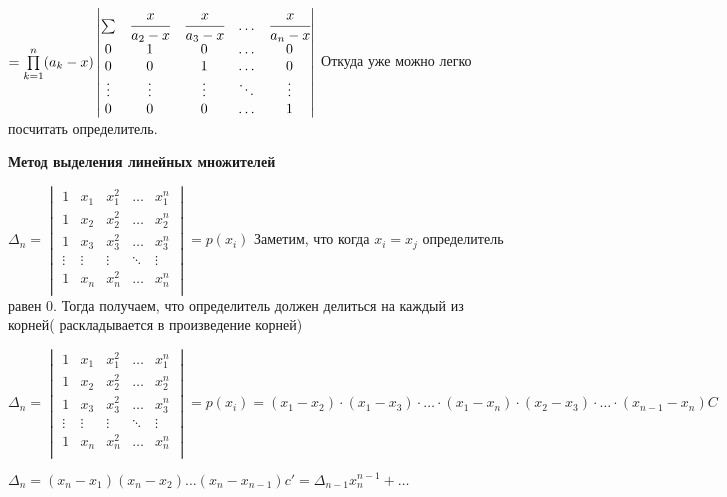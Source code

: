 \(=
\prod\limits_{k=1}^n (a_k-x)
\begin{vmatrix}
    \sum   & \cfrac{x}{a_2-x} & \cfrac{x}{a_3-x} & \ldots & \cfrac{x}{a_n-x} \\
    0      & 1                & 0                & \ldots & 0                \\
    0      & 0                & 1                & \ldots & 0                \\
    \vdots & \vdots           & \vdots           & \ddots & \vdots           \\
    0      & 0                & 0                & \ldots & 1                \\
\end{vmatrix}
\)
Откуда уже можно легко посчитать определитель.

\textbf{Метод выделения линейных множителей}


\(
\Delta_n = \begin{vmatrix}
    1      & x_1    & x_1^2  & \ldots & x_1^n  \\
    1      & x_2    & x_2^2  & \ldots & x_2^n  \\
    1      & x_3    & x_3^2  & \ldots & x_3^n  \\
    \vdots & \vdots & \vdots & \ddots & \vdots \\
    1      & x_n    & x_n^2  & \ldots & x_n^n  \\
\end{vmatrix} = p(x_i)
\)
Заметим, что когда \(x_i  = x_j \) определитель равен 0. Тогда получаем, что определитель должен делиться на каждый из корней( раскладывается в произведение корней)

\(
\Delta_n = \begin{vmatrix}
    1      & x_1    & x_1^2  & \ldots & x_1^n  \\
    1      & x_2    & x_2^2  & \ldots & x_2^n  \\
    1      & x_3    & x_3^2  & \ldots & x_3^n  \\
    \vdots & \vdots & \vdots & \ddots & \vdots \\
    1      & x_n    & x_n^2  & \ldots & x_n^n  \\
\end{vmatrix} = p(x_i) = (x_1 - x_2) \cdot (x_1  - x_3) \cdot \ldots \cdot (x_1 - x_n) \cdot (x_2 - x_3) \cdot \ldots \cdot (x_{n-1}-x_n) C
\)

\(\Delta_n = (x_n - x_1)(x_n - x_2)\ldots(x_n - x_{n - 1}) c' = \Delta_{n - 1} x_n^{n - 1} + \ldots\)


